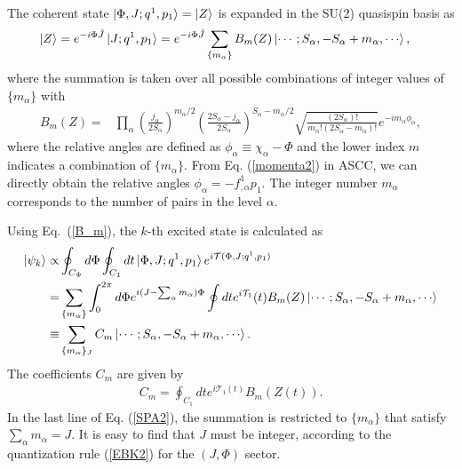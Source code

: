 \documentclass[11pt]{book} %
\begin{document}
The coherent state $\ket{\Phi,J;q^1,p_1}=\ket{Z}$ is
expanded in the SU(2) quasispin basis as
\begin{align}
\ket{Z} &= e^{-i\Phi \hat{J}} \ket{J;q^1,p_1}
 = e^{-i\Phi \hat{J}}\sum_{\{m_\alpha\}} B_m(Z) \ket{\cdots;S_\alpha,-S_\alpha+m_\alpha,\cdots},
\label{coherent2}
\end{align}
where the summation is taken over all possible combinations
of integer values of $\{ m_\alpha\}$ with
\begin{align}
B_m(Z) 
  =& \prod_\alpha \left(\frac{j_\alpha}{2S_\alpha}\right)^{m_\alpha/2}\left(\frac{2S_\alpha-j_\alpha}{2S_\alpha}\right)^{S_\alpha-m_\alpha/2}
 \sqrt{\frac{(2S_\alpha)!}{m_\alpha!(2S_\alpha-m_\alpha)!}}
e^{-i m_\alpha\phi_\alpha}  ,
	\label{B_m}
\end{align}
where the relative angles are defined as
$\phi_\alpha\equiv\chi_\alpha-\Phi$ and the lower index $m$ indicates a combination of $\{ m_\alpha \}$. From Eq. (\ref{momenta2}) in ASCC, we can directly obtain the relative angles $\phi_\alpha = -f^1_{,\alpha}p_1$.
The integer number $m_\alpha$ corresponds to the number of pairs
in the level $\alpha$.
%

Using Eq.~(\ref{B_m}),
the $k$-th excited state is calculated as
\begin{align}
\ket{\psi_k} \propto& \oint_{C_\Phi} d\Phi \oint_{C_1} dt
\ket{\Phi,J;q^1,p_1} e^{i\mathcal{T}(\Phi,J;q^1,p_1)}
 \nonumber \\
	=& \sum_{\{m_\alpha\}}
	\int_0^{2\pi} d\Phi e^{i(J-\sum_\alpha m_\alpha)\Phi} \oint dt e^{i\mathcal{T}_1}(t) B_m (Z) \ket{\cdots;S_\alpha,-S_\alpha+m_\alpha,\cdots} \nonumber \\
 \equiv& \sum_{\{m_\alpha\}_J} C_m \ket{\cdots;S_\alpha,-S_\alpha+m_\alpha,\cdots}.
 \label{SPA2}
\end{align}
The coefficients $C_m$ are given by
\begin{align}
C_m = \oint_{C_1} dt e^{i\mathcal{T}_1(t)} B_m(Z(t)).
  \label{coef}
\end{align}
In the last line of Eq. (\ref{SPA2}), the summation is restricted to
$\{m_\alpha\}$ that satisfy $\sum_\alpha m_\alpha=J$.
It is easy to find that $J$ must be integer,
according to the quantization rule (\ref{EBK2}) for the $(J,\Phi)$ sector.
\end{document}
